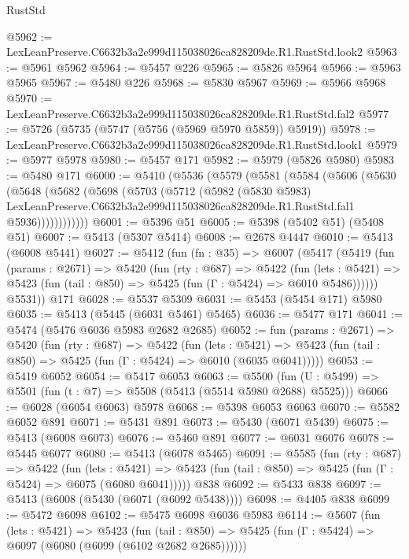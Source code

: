 \begin{lexlean}{RustStd}
\begin{coremodule}
@5962 := LexLeanPreserve.C6632b3a2e999d115038026ca828209de.R1.RustStd.look2
@5963 := @5961 @5962
@5964 := @5457 @226
@5965 := @5826 @5964
@5966 := @5963 @5965
@5967 := @5480 @226
@5968 := @5830 @5967
@5969 := @5966 @5968
@5970 := LexLeanPreserve.C6632b3a2e999d115038026ca828209de.R1.RustStd.fal2
@5977 := @5726 (@5735 (@5747 (@5756 (@5969 @5970 @5859)) @5919))
@5978 := LexLeanPreserve.C6632b3a2e999d115038026ca828209de.R1.RustStd.look1
@5979 := @5977 @5978
@5980 := @5457 @171
@5982 := @5979 (@5826 @5980)
@5983 := @5480 @171
@6000 := @5410
    (@5536
      (@5579
        (@5581
          (@5584
            (@5606
              (@5630
                (@5648
                  (@5682
                    (@5698
                      (@5703
                        (@5712
                          (@5982
                            (@5830 @5983)
                            LexLeanPreserve.C6632b3a2e999d115038026ca828209de.R1.RustStd.fal1
                            @5936))))))))))))
@6001 := @5396 @51
@6005 := @5398 (@5402 @51) (@5408 @51)
@6007 := @5413 (@5307 @5414)
@6008 := @2678 @4447
@6010 := @5413 (@6008 @5441)
@6027 := @5412
    (fun (fn : @35) =>
    @6007
      (@5417
        (@5419
          (fun (params : @2671) =>
          @5420
            (fun (rty : @687) =>
            @5422
              (fun (lets : @5421) =>
              @5423 (fun (tail : @850) => @5425 (fun (Γ : @5424) => @6010 @5486))))))
        @5531))
    @171
@6028 := @5537 @5309
@6031 := @5453 (@5454 @171) @5980
@6035 := @5413 (@5445 (@6031 @5461) @5465)
@6036 := @5477 @171
@6041 := @5474 (@5476 @6036 @5983 @2682 @2685)
@6052 := fun (params : @2671) =>
  @5420
    (fun (rty : @687) =>
    @5422
      (fun (lets : @5421) =>
      @5423 (fun (tail : @850) => @5425 (fun (Γ : @5424) => @6010 (@6035 @6041)))))
@6053 := @5419 @6052
@6054 := @5417 @6053
@6063 := @5500 (fun (U : @5499) => @5501 (fun (t : @7) => @5508 (@5413 (@5514 @5980 @2688) @5525)))
@6066 := @6028 (@6054 @6063) @5978
@6068 := @5398 @6053 @6063
@6070 := @5582 @6052 @891
@6071 := @5431 @891
@6073 := @5430 (@6071 @5439)
@6075 := @5413 (@6008 @6073)
@6076 := @5460 @891
@6077 := @6031 @6076
@6078 := @5445 @6077
@6080 := @5413 (@6078 @5465)
@6091 := @5585
    (fun (rty : @687) =>
    @5422
      (fun (lets : @5421) =>
      @5423 (fun (tail : @850) => @5425 (fun (Γ : @5424) => @6075 (@6080 @6041)))))
    @838
@6092 := @5433 @838
@6097 := @5413 (@6008 (@5430 (@6071 (@6092 @5438))))
@6098 := @4405 @838
@6099 := @5472 @6098
@6102 := @5475 @6098 @6036 @5983
@6114 := @5607
    (fun (lets : @5421) =>
    @5423
      (fun (tail : @850) => @5425 (fun (Γ : @5424) => @6097 (@6080 (@6099 (@6102 @2682 @2685))))))

\end{coremodule}
\end{lexlean}
